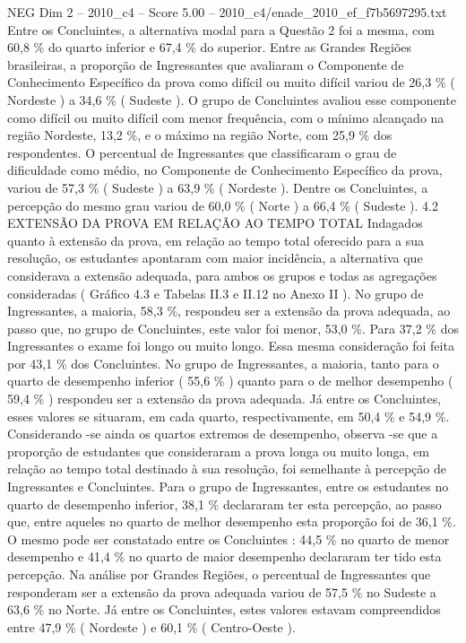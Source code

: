 \begin{textsample}{NEG Dim 2 – 2010\_c4 – Score 5.00 – 2010\_c4/enade\_2010\_ef\_f7b5697295.txt}
Entre os Concluintes, a alternativa modal para a Questão 2 foi a mesma, com 60,8 \% do quarto inferior e 67,4 \% do superior.
Entre as Grandes Regiões brasileiras, a proporção de Ingressantes que avaliaram o Componente de Conhecimento Específico da prova como difícil ou muito difícil variou de 26,3 \% ( Nordeste ) a 34,6 \% ( Sudeste ).
O grupo de Concluintes avaliou esse componente como difícil ou muito difícil com menor frequência, com o mínimo alcançado na região Nordeste, 13,2 \%, e o máximo na região Norte, com 25,9 \% dos respondentes.
O percentual de Ingressantes que classificaram o grau de dificuldade como médio, no Componente de Conhecimento Específico da prova, variou de 57,3 \% ( Sudeste ) a 63,9 \% ( Nordeste ).
Dentre os Concluintes, a percepção do mesmo grau variou de 60,0 \% ( Norte ) a 66,4 \% ( Sudeste ). 4.2 EXTENSÃO DA PROVA EM RELAÇÃO AO TEMPO TOTAL Indagados quanto à extensão da prova, em relação ao tempo total oferecido para a sua resolução, os estudantes apontaram com maior incidência, a alternativa que considerava a extensão adequada, para ambos os grupos e todas as agregações consideradas ( Gráfico 4.3 e Tabelas II.3 e II.12 no Anexo II ).
No grupo de Ingressantes, a maioria, 58,3 \%, respondeu ser a extensão da prova adequada, ao passo que, no grupo de Concluintes, este valor foi menor, 53,0 \%.
Para 37,2 \% dos Ingressantes o exame foi longo ou muito longo.
Essa mesma consideração foi feita por 43,1 \% dos Concluintes.
No grupo de Ingressantes, a maioria, tanto para o quarto de desempenho inferior ( 55,6 \% ) quanto para o de melhor desempenho ( 59,4 \% ) respondeu ser a extensão da prova adequada.
Já entre os Concluintes, esses valores se situaram, em cada quarto, respectivamente, em 50,4 \% e 54,9 \%.
Considerando -se ainda os quartos extremos de desempenho, observa -se que a proporção de estudantes que consideraram a prova longa ou muito longa, em relação ao tempo total destinado à sua resolução, foi semelhante à percepção de Ingressantes e Concluintes.
Para o grupo de Ingressantes, entre os estudantes no quarto de desempenho inferior, 38,1 \% declararam ter esta percepção, ao passo que, entre aqueles no quarto de melhor desempenho esta proporção foi de 36,1 \%.
O mesmo pode ser constatado entre os Concluintes : 44,5 \% no quarto de menor desempenho e 41,4 \% no quarto de maior desempenho declararam ter tido esta percepção.
Na análise por Grandes Regiões, o percentual de Ingressantes que responderam ser a extensão da prova adequada variou de 57,5 \% no Sudeste a 63,6 \% no Norte.
Já entre os Concluintes, estes valores estavam compreendidos entre 47,9 \% ( Nordeste ) e 60,1 \% ( Centro-Oeste ).

\end{textsample}
